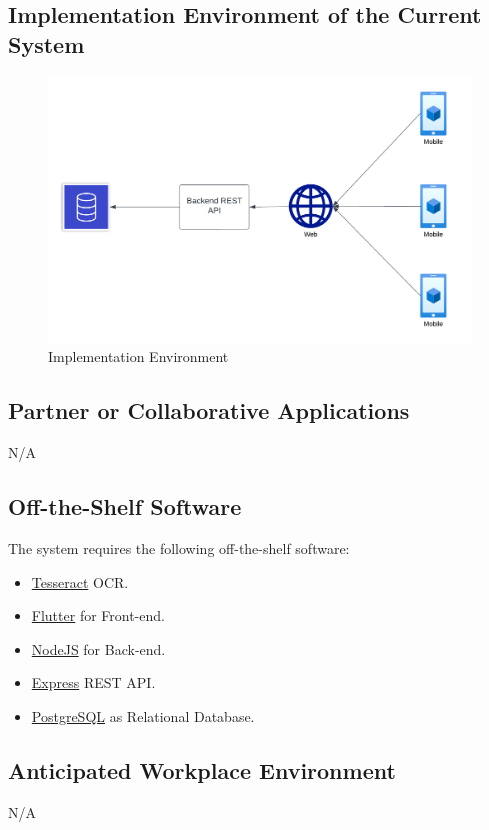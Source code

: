 \documentclass[12pt]{article}
\begin{document}
\subsection{Implementation Environment of the Current System}
\begin{figure}[H]
  \centering
  \includegraphics[width=\textwidth]{ImplementationEnvironment.png}
  \caption{Implementation Environment}
  \label{fig:ImplementationEnvironment}
\end{figure}

\subsection{Partner or Collaborative Applications}
N/A
\subsection{Off-the-Shelf Software}
The system requires the following off-the-shelf software:
\begin{itemize}
  \item \href{https://github.com/tesseract-ocr/tesseract}{Tesseract} OCR.
  \item \href{https://flutter.dev/}{Flutter} for Front-end.
  \item \href{https://nodejs.org/en}{NodeJS} for Back-end.
  \item \href{https://www.npmjs.com/package/express}{Express} REST API.
  \item \href{https://www.postgresql.org/}{PostgreSQL} as Relational Database.
\end{itemize}

\subsection{Anticipated Workplace Environment}
N/A
\end{document}
